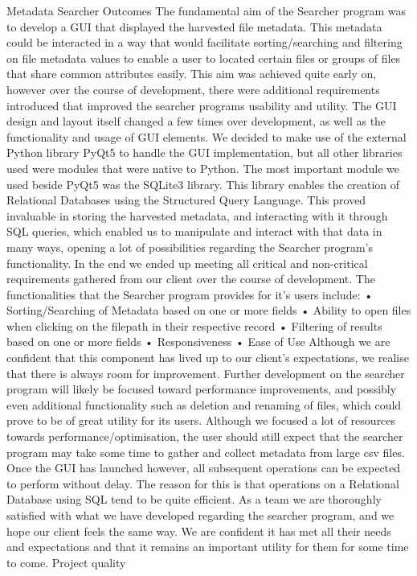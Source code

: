 \documentclass[11pt]{article}
\begin{document}
Metadata Searcher Outcomes
The fundamental aim of the Searcher program was to develop a GUI that displayed the harvested file metadata. This metadata could be interacted in a way that would facilitate sorting/searching and filtering on file metadata values to enable a user to located certain files or groups of files that share common attributes easily.
This aim was achieved quite early on, however over the course of development, there were additional requirements introduced that improved the searcher programs usability and utility. The GUI design and layout itself changed a few times over development, as well as the functionality and usage of GUI elements.
We decided to make use of the external Python library PyQt5 to handle the GUI implementation, but all other libraries used were modules that were native to Python. The most important module we used beside PyQt5 was the SQLite3 library. This library enables the creation of Relational Databases using the Structured Query Language. This proved invaluable in storing the harvested metadata, and interacting with it through SQL queries, which enabled us to manipulate and interact with that data in many ways, opening a lot of possibilities regarding the Searcher program’s functionality.
In the end we ended up meeting all critical and non-critical requirements gathered from our client over the course of development. The functionalities that the Searcher program provides for it’s users include:
•	Sorting/Searching of Metadata based on one or more fields
•	Ability to open files when clicking on the filepath in their respective record
•	Filtering of results based on one or more fields
•	Responsiveness
•	Ease of Use
Although we are confident that this component has lived up to our client’s expectations, we realise that there is always room for improvement. Further development on the searcher program will likely be focused toward performance improvements, and possibly even additional functionality such as deletion and renaming of files, which could prove to be of great utility for its users.
Although we focused a lot of resources towards performance/optimisation, the user should still expect that the searcher program may take some time to gather and collect metadata from large csv files. Once the GUI has launched however, all subsequent operations can be expected to perform without delay. The reason for this is that operations on a Relational Database using SQL tend to be quite efficient.
As a team we are thoroughly satisfied with what we have developed regarding the searcher program, and we hope our client feels the same way. We are confident it has met all their needs and expectations and that it remains an important utility for them for some time to come.
Project quality
\end{document}
